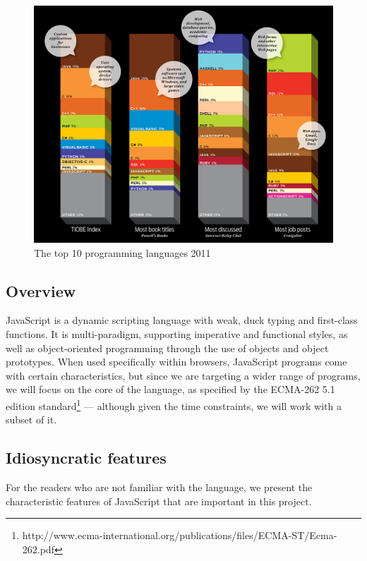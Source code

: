 \begin{figure}
\hspace*{-1.2cm}
\centering
\includegraphics[scale=0.45]{./components/chapter2/TIOBEgraph.jpeg}
\caption{The top 10 programming languages 2011 \cite{tiobe}}
\label{TIOBEgraph}
\end{figure}

\subsection{Overview}

JavaScript is a dynamic scripting language with weak, duck typing and first-class functions. It is multi-paradigm, supporting imperative and functional styles, as well as object-oriented programming through the use of objects and object prototypes. When used specifically within browsers, JavaScript programs come with certain characteristics, but since we are targeting a wider range of programs, we will focus on the core of the language, as specified by the ECMA-262 5.1 edition standard\footnote{http://www.ecma-international.org/publications/files/ECMA-ST/Ecma-262.pdf} --- although given the time constraints, we will work with a subset of it.

\subsection{Idiosyncratic features}
For the readers who are not familiar with the language, we present the characteristic features of JavaScript \cite{flanagan2006javascript} that are important in this project.


